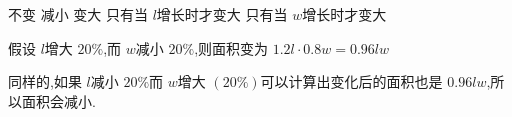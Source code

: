 \documentclass[answers]{exam}
\begin{document}
\begin{questions}
	\begin{oneparchoices}
		\choice 不变 \CorrectChoice 减小 \choice 变大 \choice 只有当 \( l \)增长时才变大 \choice 只有当 \( w \)增长时才变大
	\end{oneparchoices}

	\begin{solution}
		假设 \( l \)增大 \( 20\% \),而 \( w \)减小 \( 20\% \),则面积变为 \( 1.2l \cdot 0.8w = 0.96lw \)

		同样的,如果 \( l \)减小 \( 20\% \)而 \( w \)增大 \( (20\%) \)可以计算出变化后的面积也是 \( 0.96lw
		\),所以面积会减小.
	\end{solution}

\end{questions}
\end{document}
